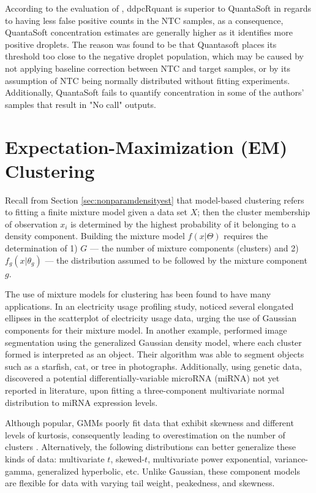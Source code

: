 According to the evaluation of , ddpcRquant is superior to QuantaSoft in regards to having less false positive counts in the NTC samples, as a consequence, QuantaSoft concentration estimates are generally higher as it identifies more positive droplets. The reason was found to be that Quantasoft places its threshold too close to the negative droplet population, which may be caused by not applying baseline correction between NTC and target samples, or by its assumption of NTC being normally distributed without fitting experiments. Additionally, QuantaSoft fails to quantify concentration in some of the authors' samples that result in "No call" outputs.

\section{Expectation-Maximization (EM) Clustering}
\label{sec:emclustering}
Recall from Section \ref{sec:nonparamdensityest} that model-based clustering refers to fitting a finite mixture model given a data set \(X\); then the cluster membership of observation \(x_i\) is determined by the highest probability of it belonging to a density component. Building the mixture model \(f(x|\Theta)\) requires the determination of 1) \(G\) — the number of mixture components (clusters) and 2) \(f_g(x|\theta_g)\) — the distribution assumed to be followed by the mixture component \(g\). 

The use of mixture models for clustering has been found to have many applications. In an electricity usage profiling study,  noticed several elongated ellipses in the scatterplot of electricity usage data, urging the use of Gaussian components for their mixture model. In another example, \cite{Choy2017} performed image segmentation using the generalized Gaussian density model, where each cluster formed is interpreted as an object. Their algorithm was able to segment objects such as a starfish, cat, or tree in photographs. Additionally, using genetic data,  discovered a potential differentially-variable microRNA (miRNA) not yet reported in literature, upon fitting a three-component multivariate normal distribution to miRNA expression levels. 

Although popular, GMMs poorly fit data that exhibit skewness and different levels of kurtosis, consequently leading to overestimation on the number of clusters \cite{Dang2019}. Alternatively, the following distributions can better generalize these kinds of data: multivariate \(t\), skewed-\(t\), multivariate power exponential, variance-gamma, generalized hyperbolic, etc. Unlike Gaussian, these component models are flexible for data with varying tail weight, peakedness, and skewness.

